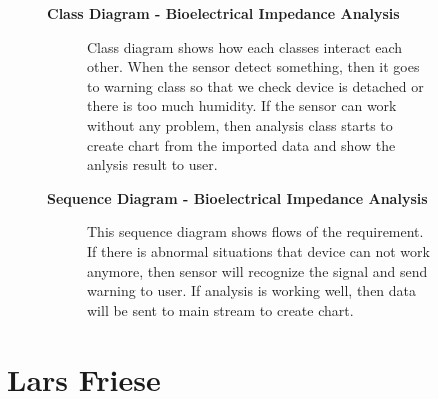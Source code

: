 \documentclass{article}
\begin{document}
		\begin{figure}[htbp]
			\textbf{Class Diagram - Bioelectrical Impedance Analysis}
			\centering
			\begin{subfigure}{\textwidth}
				\resizebox{\textwidth}{!}{}
			\end{subfigure}
			\begin{subfigure}{\textwidth}
				Class diagram shows how each classes interact each other. When the sensor detect something, then it goes to warning class so that we check device is detached or there is too much humidity. If the sensor can work without any problem, then analysis class starts to create chart from the imported data and show the anlysis result to user.
			\end{subfigure}
		\end{figure}
		\clearpage
		
		\begin{figure}[htbp]
			\textbf{Sequence Diagram - Bioelectrical Impedance Analysis}
			\centering
			\begin{subfigure}{\textwidth}
				\centering
				\scalebox{0.7}{}
			\end{subfigure}
			\begin{subfigure}{\textwidth}
				This sequence diagram shows flows of the requirement. If there is abnormal situations that device can not work anymore, then sensor will recognize the signal and send warning to user. If analysis is working well, then data will be sent to main stream to create chart.
			\end{subfigure}
		\end{figure}
		\clearpage   


\section{Lars Friese}
\end{document}
